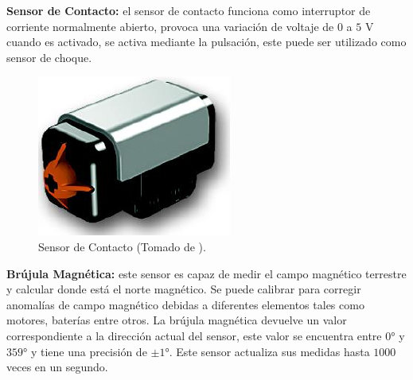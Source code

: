 \documentclass[twocolumn]{IEEEtran}
\begin{document}
\begin{enumerate}
\textbf{Sensor de Contacto:} el sensor de contacto funciona como interruptor de corriente normalmente abierto, provoca una variación de voltaje de $0$ a $5$ V cuando es activado, se activa mediante la pulsación, este puede ser utilizado como sensor de choque.
\begin{figure}[H]
	\centering
		\includegraphics[scale=0.6]{tacto.png}
	\caption{Sensor de Contacto (Tomado de \cite{page2}).}
	\label{fig4}
\end{figure}
\noindent
\textbf{Brújula Magnética:} este sensor es capaz de medir el campo magnético terrestre y calcular donde está el norte magnético.  Se puede calibrar para corregir anomalías de campo magnético debidas a diferentes elementos tales como motores, baterías entre otros. La brújula magnética devuelve un valor correspondiente a la dirección actual del sensor, este valor se encuentra entre $0°$ y $359°$  y  tiene una precisión de $ \pm 1°$.  Este sensor actualiza sus medidas hasta $100$0 veces en un segundo.
\end{enumerate}
\end{document}
